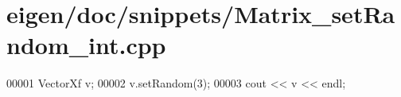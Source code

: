 \hypertarget{eigen_2doc_2snippets_2_matrix__set_random__int_8cpp_source}{}\section{eigen/doc/snippets/\+Matrix\+\_\+set\+Random\+\_\+int.cpp}
\label{eigen_2doc_2snippets_2_matrix__set_random__int_8cpp_source}

\begin{DoxyCode}
00001 VectorXf v;
00002 v.setRandom(3);
00003 cout << v << endl;
\end{DoxyCode}
